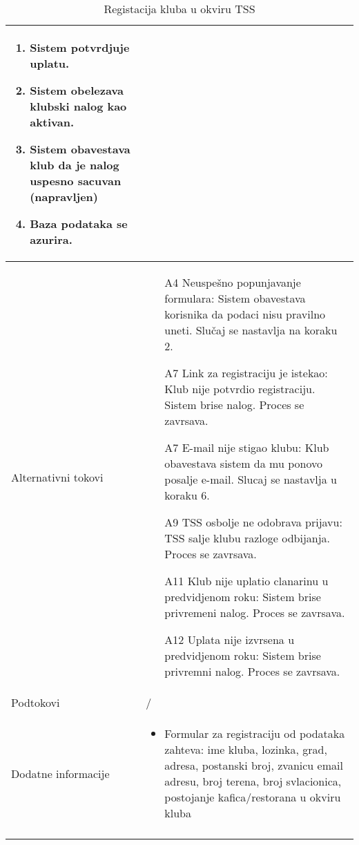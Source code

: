 \documentclass{article}
\begin{document}
\begin{longtable}{| p{} | p{} |}
\begin{enumerate}
        \item Sistem potvrdjuje uplatu.
        \item Sistem obelezava klubski nalog kao aktivan.
        \item Sistem obavestava klub da je nalog uspesno sacuvan (napravljen)
        \item Baza podataka se azurira.
    \end{enumerate}\\
\hline
    Alternativni tokovi & \begin{itemize}
        \item[A4] Neuspešno popunjavanje formulara: Sistem obavestava korisnika da podaci nisu pravilno uneti. Slučaj se nastavlja na koraku 2.
        \item[A7] Link za registraciju je istekao: Klub nije potvrdio registraciju. Sistem brise nalog. Proces se zavrsava.
        \item[A7] E-mail nije stigao klubu: Klub obavestava sistem da mu ponovo posalje e-mail. Slucaj se nastavlja u koraku 6.
        \item[A9] TSS osbolje ne odobrava prijavu: TSS salje klubu razloge odbijanja. Proces se zavrsava.
        \item[A11] Klub nije uplatio clanarinu u predvidjenom roku: Sistem brise privremeni nalog. Proces se zavrsava.
        \item[A12] Uplata nije izvrsena u predvidjenom roku: Sistem brise privremni nalog. Proces se zavrsava.
    \end{itemize}\\
\hline
    Podtokovi & /\\

\hline
    Dodatne informacije & \begin{itemize}
        \item Formular za registraciju od podataka zahteva: ime kluba, lozinka, grad, adresa, postanski broj, zvanicu email adresu, broj terena, broj svlacionica, postojanje kafica/restorana u okviru kluba
    \end{itemize} \\
\hline
\caption{Registacija kluba u okviru TSS} %
\end{longtable}


\end{document}
